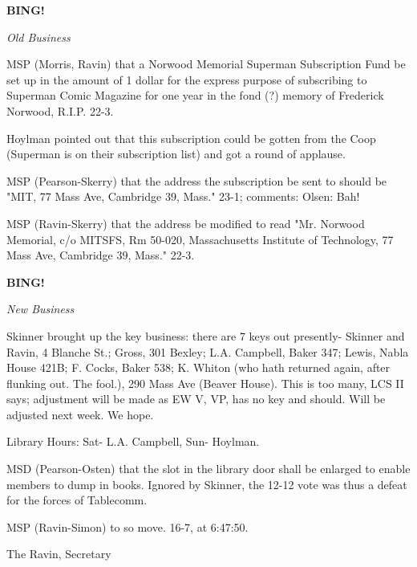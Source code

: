 \documentclass[12pt]{article}
\newcommand{\bing}{{\bf BING!} }
\newcommand{\goto}[1]{\bing \vskip 12pt \centerline{{\em{#1}}}}
\begin{document}
\goto{Old Business}

MSP (Morris, Ravin) that a Norwood Memorial Superman Subscription Fund be set up in the amount of 1 dollar for the express purpose of subscribing to Superman Comic Magazine for one year in the fond (?) memory of Frederick Norwood, R.I.P. 22-3.

Hoylman pointed out that this subscription could be gotten from the Coop (Superman is on their subscription list) and got a round of applause.

MSP (Pearson-Skerry) that the address the subscription be sent to should be "MIT, 77 Mass Ave, Cambridge 39, Mass." 23-1; comments: Olsen: Bah!

MSP (Ravin-Skerry) that the address be modified to read "Mr. Norwood Memorial, c/o MITSFS, Rm 50-020, Massachusetts Institute of Technology, 77 Mass Ave, Cambridge 39, Mass." 22-3.

\goto{New Business}

Skinner brought up the key business: there are 7 keys out presently- Skinner and Ravin, 4 Blanche St.; Gross, 301 Bexley; L.A. Campbell, Baker 347; Lewis, Nabla House 421B; F. Cocks, Baker 538; K. Whiton (who hath returned again, after flunking out. The fool.), 290 Mass Ave (Beaver House). This is too many, LCS II says; adjustment will be made as EW V, VP, has no key and should. Will be adjusted next week. We hope.

Library Hours: Sat- L.A. Campbell, Sun- Hoylman.

MSD (Pearson-Osten) that the slot in the library door shall be enlarged to enable members to dump in books. Ignored by Skinner, the 12-12 vote was thus a defeat for the forces of Tablecomm.

MSP (Ravin-Simon) to so move. 16-7, at 6:47:50.

\vspace{12pt}

\centerline{The Ravin, Secretary}
\end{document}
